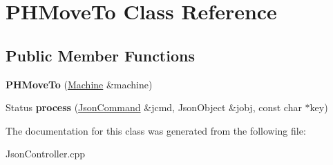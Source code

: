 \hypertarget{class_p_h_move_to}{\section{P\+H\+Move\+To Class Reference}
\label{class_p_h_move_to}
}
\subsection*{Public Member Functions}
\begin{DoxyCompactItemize}
\item 
\hypertarget{class_p_h_move_to_a679a00d968762b970973c9b3f8d1b85b}{{\bfseries P\+H\+Move\+To} (\hyperlink{classfirestep_1_1_machine}{Machine} \&machine)}\label{class_p_h_move_to_a679a00d968762b970973c9b3f8d1b85b}

\item 
\hypertarget{class_p_h_move_to_aff7bb6384678fcc9c3fbd9afdfc46697}{Status {\bfseries process} (\hyperlink{classfirestep_1_1_json_command}{Json\+Command} \&jcmd, Json\+Object \&jobj, const char $\ast$key)}\label{class_p_h_move_to_aff7bb6384678fcc9c3fbd9afdfc46697}

\end{DoxyCompactItemize}


The documentation for this class was generated from the following file\+:\begin{DoxyCompactItemize}
\item 
Json\+Controller.\+cpp\end{DoxyCompactItemize}
